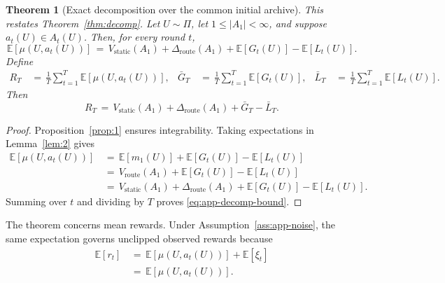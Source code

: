 \documentclass{article} %
\newtheorem{theorem}{Theorem}
\begin{document}
\begin{theorem}[Exact decomposition over the common initial archive]
\label{thm:main}
This restates Theorem~\ref{thm:decomp}.  Let \(U\sim\Pi\), let
\(1\leq |A_1|<\infty\), and suppose \(a_t(U)\in A_t(U)\).  Then, for every
round \(t\),
\begin{equation}
\mathbb{E}[\mu(U,a_t(U))]
\,=\,
V_{\mathrm{static}}(A_1)
+
\Delta_{\mathrm{route}}(A_1)
+
\mathbb{E}[G_t(U)]
-
\mathbb{E}[L_t(U)].
\end{equation}
Define
\begin{equation}
\begin{aligned}
R_T
&\,=\,\frac1T\sum_{t=1}^T\mathbb E[\mu(U,a_t(U))], &
\bar G_T
&\,=\,\frac1T\sum_{t=1}^T\mathbb E[G_t(U)], &
\bar L_T
&\,=\,\frac1T\sum_{t=1}^T\mathbb E[L_t(U)].
\end{aligned}
\end{equation}
Then
\begin{equation}
\label{eq:app-decomp-bound}
R_T
\,=\,
V_{\mathrm{static}}(A_1)
+
\Delta_{\mathrm{route}}(A_1)
+
\bar G_T
-
\bar L_T.
\end{equation}
\end{theorem}

\begin{proof}
Proposition~\ref{prop:1} ensures integrability.  Taking expectations in
Lemma~\ref{lem:2} gives
\begin{equation}
\begin{aligned}
\mathbb{E}[\mu(U,a_t(U))]
&\,=\,
  \mathbb E[m_1(U)]+\mathbb E[G_t(U)]-\mathbb E[L_t(U)] \\
&\,=\,
  V_{\mathrm{route}}(A_1)+\mathbb E[G_t(U)]-\mathbb E[L_t(U)] \\
&\,=\,
V_{\mathrm{static}}(A_1)
+
\Delta_{\mathrm{route}}(A_1)
+
\mathbb E[G_t(U)]
-
\mathbb E[L_t(U)].
\end{aligned}
\end{equation}
Summing over \(t\) and dividing by \(T\) proves
\eqref{eq:app-decomp-bound}.
\end{proof}

The theorem concerns mean rewards.  Under Assumption~\ref{ass:app-noise}, the
same expectation governs unclipped observed rewards because
\begin{equation}
\label{eq:app-observed-mean-link}
\begin{aligned}
\mathbb{E}[r_t]
&\,=\,\mathbb E[\mu(U,a_t(U))]+\mathbb E[\xi_t] \\
&\,=\,
\mathbb{E}[\mu(U,a_t(U))].
\end{aligned}
\end{equation}
\end{document}
